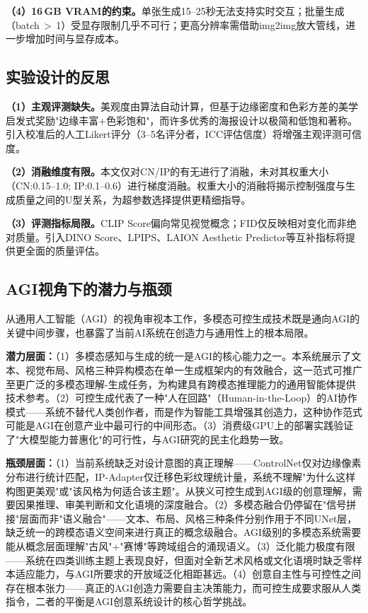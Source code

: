 \documentclass[12pt,a4paper]{ctexart}
\begin{document}
\textbf{（4）16\,GB VRAM的约束。}单张生成15--25秒无法支持实时交互；批量生成（batch\,$>$\,1）受显存限制几乎不可行；更高分辨率需借助img2img放大管线，进一步增加时间与显存成本。

\subsection{实验设计的反思}

\textbf{（1）主观评测缺失。}美观度由算法自动计算，但基于边缘密度和色彩方差的美学启发式奖励"边缘丰富+色彩饱和"，而许多优秀的海报设计以极简和低饱和著称。引入校准后的人工Likert评分（3--5名评分者，ICC评估信度）将增强主观评测可信度。

\textbf{（2）消融维度有限。}本文仅对CN/IP的有无进行了消融，未对其权重大小（CN:0.15--1.0; IP:0.1--0.6）进行梯度消融。权重大小的消融将揭示控制强度与生成质量之间的U型关系，为超参数选择提供更精细指导。

\textbf{（3）评测指标局限。}CLIP Score偏向常见视觉概念；FID仅反映相对变化而非绝对质量。引入DINO Score、LPIPS、LAION Aesthetic Predictor等互补指标将提供更全面的质量评估。

\subsection{AGI视角下的潜力与瓶颈}

从通用人工智能（AGI）的视角审视本工作，多模态可控生成技术既是通向AGI的关键中间步骤，也暴露了当前AI系统在创造力与通用性上的根本局限。

\textbf{潜力层面：}（1）多模态感知与生成的统一是AGI的核心能力之一。本系统展示了文本、视觉布局、风格三种异构模态在单一生成框架内的有效融合，这一范式可推广至更广泛的多模态理解-生成任务，为构建具有跨模态推理能力的通用智能体提供技术参考。（2）可控生成代表了一种"人在回路"（Human-in-the-Loop）的AI协作模式——系统不替代人类创作者，而是作为智能工具增强其创造力，这种协作范式可能是AGI在创意产业中最可行的中间形态。（3）消费级GPU上的部署实践验证了"大模型能力普惠化"的可行性，与AGI研究的民主化趋势一致。

\textbf{瓶颈层面：}（1）当前系统缺乏对设计意图的真正理解——ControlNet仅对边缘像素分布进行统计匹配，IP-Adapter仅迁移色彩纹理统计量，系统不理解"为什么这样构图更美观"或"该风格为何适合该主题"。从狭义可控生成到AGI级的创意理解，需要因果推理、审美判断和文化语境的深度融合。（2）多模态融合仍停留在"信号拼接"层面而非"语义融合"——文本、布局、风格三种条件分别作用于不同UNet层，缺乏统一的跨模态语义空间来进行真正的概念级融合。AGI级别的多模态系统需要能从概念层面理解"古风"+"赛博"等跨域组合的涌现语义。（3）泛化能力极度有限——系统在四类训练主题上表现良好，但面对全新艺术风格或文化语境时缺乏零样本适应能力，与AGI所要求的开放域泛化相距甚远。（4）创意自主性与可控性之间存在根本张力——真正的AGI创造力需要自主决策能力，而可控生成要求服从人类指令，二者的平衡是AGI创意系统设计的核心哲学挑战。
\end{document}
